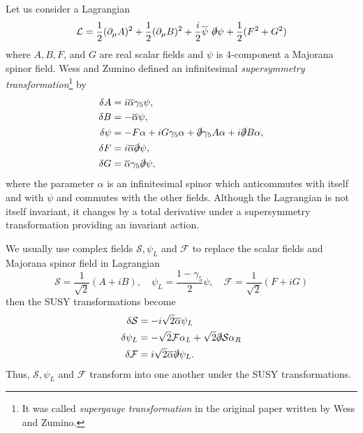 \documentclass[12pt]{report}
\begin{document}
Let us consider a Lagrangian
\begin{equation}
\mathcal{L} = \frac{1}{2} (\partial_{\mu} A)^{2} + \frac{1}{2} (\partial_{\mu} B)^{2} + \frac{i}{2} \overline{\psi} \ \slashed{\partial} \psi + \frac{1}{2} (F^{2} + G^{2})
\end{equation}
where $A, B, F$, and $G$ are real scalar fields and $\psi$ is 4-component a Majorana spinor field.
Wess and Zumino \cite{wess_and_zumino} defined an infinitesimal \textit{supersymmetry transformation}\footnote{It was called \textit{supergauge transformation} in the original paper written by Wess and Zumino.} by
\begin{align}
\delta A &= i \overline{\alpha} \gamma_{5} \psi ,\label{eq: 3.2}\\
\delta B &= - \overline{\alpha} \psi ,\\
\delta \psi &= -F \alpha + i G \gamma_{5} \alpha + \slashed{\partial} \gamma_{5} A \alpha + i \slashed{\partial} B \alpha ,\\
\delta F &= i \overline{\alpha} \slashed{\partial} \psi ,\\
\delta G &= \overline{\alpha} \gamma_{5} \slashed{\partial} \psi \label{eq: 3.6},
\end{align}
where the parameter $\alpha$ is an infinitesimal spinor which anticommutes with itself and with $\psi$ and commutes with the other fields.
Although the Lagrangian is not itself invariant, it changes by a total derivative under a supersymmetry transformation providing an invariant action.

We usually use complex fields $\mathcal{S}, \psi_{L}$ and $\mathcal{F}$ to replace the scalar fields and Majorana spinor field in Lagrangian
\begin{equation}
\mathcal{S} = \frac{1}{\sqrt{2}} (A + i B), \quad \psi_{L} = \frac{1 - \gamma_{5}}{2} \psi, \quad \mathcal{F} = \frac{1}{\sqrt{2}} (F + i G)
\end{equation}
then the SUSY transformations become
\begin{align}
\delta \mathcal{S} &= -i \sqrt{2} \overline{\alpha} \psi_{L} \label{eq: SUSY transformation 1}\\
\delta \psi_{L} &= - \sqrt{2} \mathcal{F} \alpha_{L} + \sqrt{2} \slashed{\partial} \mathcal{S} \alpha_{R} \label{eq: SUSY transformation 2}\\
\delta \mathcal{F} &= i \sqrt{2} \overline{\alpha} \slashed{\partial} \psi_{L} \label{eq: SUSY transformation 3} .
\end{align}
Thus, $\mathcal{S}, \psi_{L}$ and $\mathcal{F}$ transform into one another under the SUSY transformations.
\end{document}
